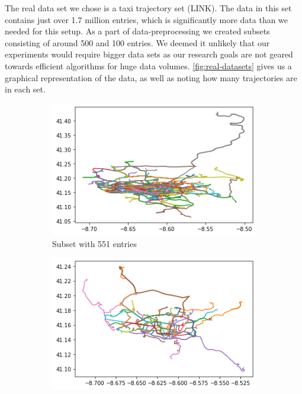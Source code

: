 The real data set we chose is a taxi trajectory set (LINK). 
The data in this set contains just over 1.7 million entries, which is significantly more data than we needed for this setup.
As a part of data-preprocessing we created subsets consisting of around 500 and 100 entries. 
We deemed it unlikely that our experiments would require bigger data sets as our research goals are not geared towards efficient algorithms for huge data volumes. \autoref{fig:real-datasets} gives us a graphical representation of the data, as well as noting how many trajectories are in each set. 

\begin{figure}
    \centering
    \begin{subfigure}{.30\textwidth}
        \centering
        \includegraphics[width=\textwidth]{figures/REAL_MED.png}
        \caption{Subset with 551 entries}
        \label{sfig:real-med}
    \end{subfigure}
    \hfill
    \begin{subfigure}{.30\textwidth}
        \centering
        \includegraphics[width=\textwidth]{figures/REAL_MINI.png}

\end{subfigure}
\end{figure}
